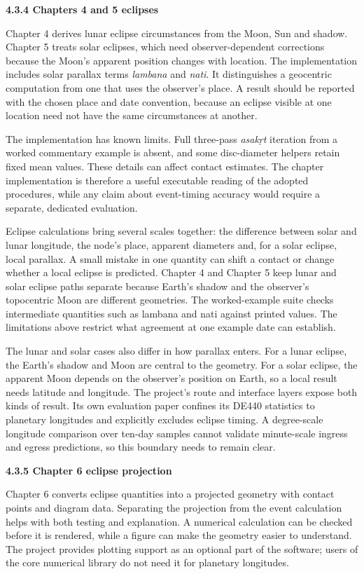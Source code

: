 \documentclass[
]{article}
\begin{document}
\textbf{4.3.4 Chapters 4 and 5 eclipses}

Chapter 4 derives lunar eclipse circumstances from the Moon, Sun and
shadow. Chapter 5 treats solar eclipses, which need observer-dependent
corrections because the Moon's apparent position changes with location.
The implementation includes solar parallax terms \emph{lambana} and
\emph{nati}. It distinguishes a geocentric computation from one that
uses the observer's place. A result should be reported with the chosen
place and date convention, because an eclipse visible at one location
need not have the same circumstances at another.

The implementation has known limits. Full three-pass \emph{asakṛt}
iteration from a worked commentary example is absent, and some
disc-diameter helpers retain fixed mean values. These details can affect
contact estimates. The chapter implementation is therefore a useful
executable reading of the adopted procedures, while any claim about
event-timing accuracy would require a separate, dedicated evaluation.

Eclipse calculations bring several scales together: the difference
between solar and lunar longitude, the node's place, apparent diameters
and, for a solar eclipse, local parallax. A small mistake in one
quantity can shift a contact or change whether a local eclipse is
predicted. Chapter 4 and Chapter 5 keep lunar and solar eclipse paths
separate because Earth's shadow and the observer's topocentric Moon are
different geometries. The worked-example suite checks intermediate
quantities such as lambana and nati against printed values. The
limitations above restrict what agreement at one example date can
establish.

The lunar and solar cases also differ in how parallax enters. For a
lunar eclipse, the Earth's shadow and Moon are central to the geometry.
For a solar eclipse, the apparent Moon depends on the observer's
position on Earth, so a local result needs latitude and longitude. The
project's route and interface layers expose both kinds of result. Its
own evaluation paper confines its DE440 statistics to planetary
longitudes and explicitly excludes eclipse timing. A degree-scale
longitude comparison over ten-day samples cannot validate minute-scale
ingress and egress predictions, so this boundary needs to remain clear.

\textbf{4.3.5 Chapter 6 eclipse projection}

Chapter 6 converts eclipse quantities into a projected geometry with
contact points and diagram data. Separating the projection from the
event calculation helps with both testing and explanation. A numerical
calculation can be checked before it is rendered, while a figure can
make the geometry easier to understand. The project provides plotting
support as an optional part of the software; users of the core numerical
library do not need it for planetary longitudes.
\end{document}
